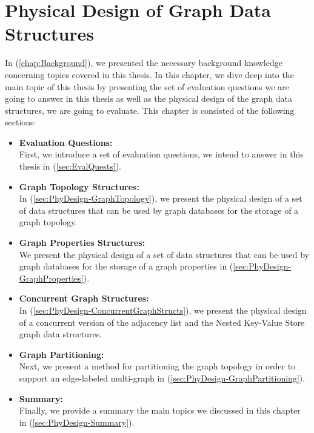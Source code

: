 {\chapter{Physical Design of Graph Data Structures}
\label{chap:PhysicalDesign}

In (\ref{chap:Background}),  we  presented  the  necessary  background  knowledge  concerning  topics covered in this thesis.  In this chapter, we dive deep into the main topic of this thesis by presenting the set of evaluation questions we are going to answer in this thesis as well as the physical design of the graph data structures, we are going to evaluate. This chapter is consisted of the following sections:
\begin{itemize}  
\item \textbf{Evaluation Questions:}\\
First, we introduce a set of evaluation questions, we intend to answer in this thesis in (\ref{sec:EvalQuests}).

\item\textbf{Graph Topology Structures:}\\
In (\ref{sec:PhyDesign-GraphTopology}), we present the physical design of a set of data structures that can be used by graph databases for the storage of a graph topology.

\item\textbf{Graph Properties Structures:}\\
We present the physical design of a set of data structures that can be used by graph databases for the storage of a graph properties in (\ref{sec:PhyDesign-GraphProperties}).

\item\textbf{Concurrent Graph Structures:}\\
In (\ref{sec:PhyDesign-ConcurrentGraphStructs}), we present the physical design of a concurrent version of the adjacency list and the Nested Key-Value Store graph data structures.

\item\textbf{Graph Partitioning:}\\
Next, we present a method for partitioning the graph topology in order to support an edge-labeled multi-graph in (\ref{sec:PhyDesign-GraphPartitioning}).

\item \textbf{Summary:}\\
Finally, we provide a summary the main topics we discussed in this chapter in (\ref{sec:PhyDesign-Summary}).
\end{itemize}



}
